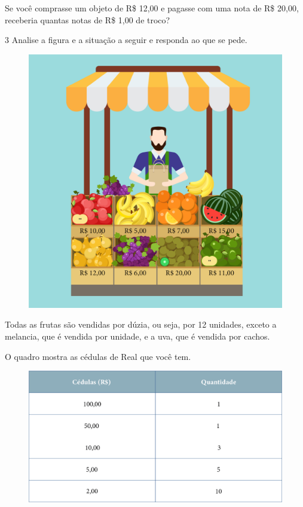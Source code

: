 Se você comprasse um objeto de R\$ 12,00 e pagasse com uma nota de R\$
20,00, receberia quantas notas de R\$ 1,00 de troco?


\num{3} Analise a figura e a situação a seguir e responda ao que se pede.



\begin{figure}[htpb!]
\centering
\includegraphics[width=.6\textwidth]{./media/image65.png}
\end{figure}

Todas as frutas são vendidas por dúzia, ou seja, por 12 unidades, exceto
a melancia, que é vendida por unidade, e a uva, que é vendida por cachos.

O quadro mostra as cédulas de Real que você tem.

\begin{figure}[htpb!]
\includegraphics[width=\textwidth]{./media/image66.png}
\end{figure}

